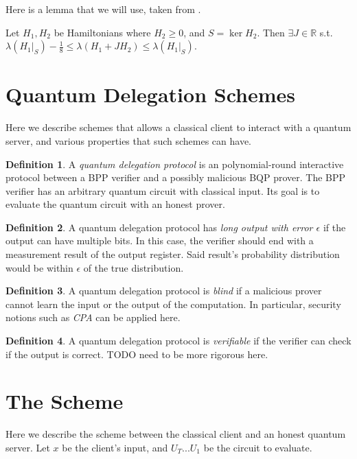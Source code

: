 \documentclass{article}
\theoremstyle{definition}
\newtheorem{definition}{Definition}[section]
\begin{document}
Here is a lemma that we will use, taken from \cite{quant-ph/0406180}.

Let $H_1, H_2$ be Hamiltonians where $H_2\geq0$, and $S=\ker H_2$.
Then $\exists J\in\mathbb{R}$ s.t.
$\lambda(H_1\big|_S)-\frac{1}{8}\leq
	\lambda(H_1+JH_2)\leq\lambda(H_1\big|_S)$.

\section{Quantum Delegation Schemes}

Here we describe schemes that allows a classical client to interact with a quantum server, and various properties that such schemes can have.

\begin{definition}
	A \emph{quantum delegation protocol} is an polynomial-round interactive protocol between a BPP verifier and a possibly malicious BQP prover. The BPP verifier has an arbitrary quantum circuit with classical input. Its goal is to evaluate the quantum circuit with an honest prover.
\end{definition}

\begin{definition}
	A quantum delegation protocol has \emph{long output with error $\epsilon$} if the output can have multiple bits. In this case, the verifier should end with a measurement result of the output register. Said result's probability distribution would be within $\epsilon$ of the true distribution.
\end{definition}

\begin{definition}
	A quantum delegation protocol is \emph{blind} if a malicious prover cannot learn the input or the output of the computation. In particular, security notions such as \emph{CPA} can be applied here.
\end{definition}

\begin{definition}
	A quantum delegation protocol is \emph{verifiable} if the verifier can check if the output is correct. TODO need to be more rigorous here.
\end{definition}

\section{The Scheme}

Here we describe the scheme between the classical client and an honest quantum server.
Let $x$ be the client's input, and $U_T...U_1$ be the circuit to evaluate.
\end{document}
